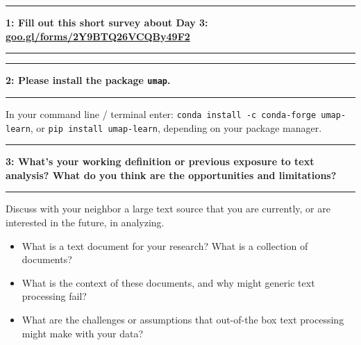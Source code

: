 \documentclass[11pt]{article}
\newcommand\question[2]{\vspace{.25in}\hrule\textbf{#1: #2}\vspace{.5em}\hrule\vspace{.10in}}
\begin{document}
\raggedright
\newcommand\NAME{Allie Morgan} 

\vspace{-0.2 in}
\question{1}{Fill out this short survey about Day 3: \href{https://goo.gl/forms/2Y9BTQ26VCQBy49F2}{goo.gl/forms/2Y9BTQ26VCQBy49F2}} 
\vspace{1 in}

\question{2}{Please install the package \texttt{umap}.}

In your command line / terminal enter: \texttt{conda install -c conda-forge umap-learn}, or \texttt{pip install umap-learn}, depending on your package manager.
\vspace{1 in}

\question{3}{What's your working definition or previous exposure to text analysis? What do you think are the opportunities and limitations?}

Discuss with your neighbor a large text source that you are currently, or are interested in the future, in analyzing. 
\begin{itemize}
\item What is a text document for your research? What is a collection of documents? 
\item What is the context of these documents, and why might generic text processing fail? 
\item What are the challenges or assumptions that out-of-the box text processing might make with your data?
\end{itemize}
\end{document}
